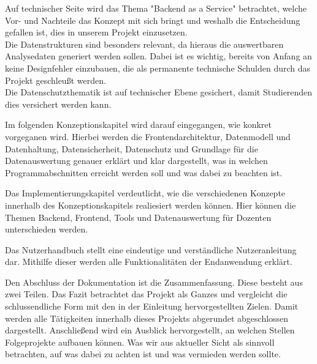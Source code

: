 Auf technischer Seite wird das Thema "Backend as a Service" betrachtet, welche Vor- und Nachteile das Konzept mit sich bringt und weshalb die Entscheidung gefallen ist, dies in unserem Projekt einzusetzen.\\
Die Datenstrukturen sind besonders relevant, da hieraus die auswertbaren Analysedaten generiert werden sollen. Dabei ist es wichtig, bereits von Anfang an keine Designfehler einzubauen, die als permanente technische Schulden durch das Projekt geschleußt werden.\\
Die Datenschutzthematik ist auf technischer Ebene gesichert, damit Studierenden dies versichert werden kann. 

Im folgenden Konzeptionskapitel wird darauf eingegangen, wie konkret vorgeganen wird. 
Hierbei werden die Frontendarchitektur, Datenmodell und Datenhaltung,  Datensicherheit, Datenschutz und Grundlage für die Datenauswertung genauer erklärt und klar dargestellt, was in welchen Programmabschnitten erreicht werden soll und was dabei zu beachten ist.

Das Implementierungskapitel verdeutlicht, wie die verschiedenen Konzepte innerhalb des Konzeptionskapitels realiesiert werden können. Hier können die Themen Backend, Frontend, Tools und Datenauswertung für Dozenten unterschieden werden.

Das Nutzerhandbuch stellt eine eindeutige und verständliche Nutzeranleitung dar. Mithilfe dieser werden alle Funktionalitäten der Endanwendung erklärt.

Den Abschluss der Dokumentation ist die Zusammenfassung. Diese besteht aus zwei Teilen.
Das Fazit betrachtet das Projekt als Ganzes und vergleicht die schlussendliche Form mit den in der Einleitung hervorgestellten Zielen. Damit werden alle Tätigkeiten innerhalb dieses Projekts abgerundet abgeschlossen dargestellt.
Anschließend wird ein Ausblick hervorgestellt, an welchen Stellen Folgeprojekte aufbauen können. Was wir aus aktueller Sicht als sinnvoll betrachten, auf was dabei zu achten ist und was vermieden werden sollte.


